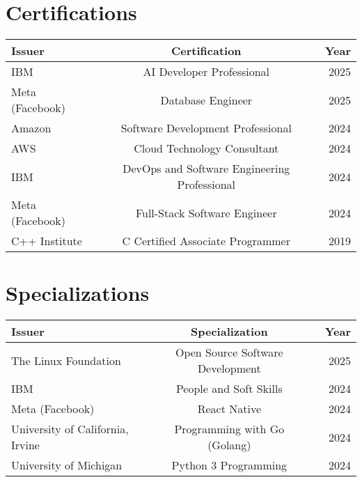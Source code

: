 \begin{samepage}
	\section{Certifications}

	\begin{tabularx}{\textwidth}{l X  c  X r}
		Issuer & & Certification & & Year \\
		\hline
		\hline
		IBM  & & AI Developer Professional & & 2025 \\
		Meta (Facebook) & & Database Engineer & & 2025 \\
		Amazon & & Software Development Professional & & 2024 \\
		AWS  & & Cloud Technology Consultant & & 2024 \\
		IBM  & & DevOps and Software Engineering Professional & & 2024 \\
		Meta (Facebook) & & Full-Stack Software Engineer & & 2024 \\
		C++ Institute & & C Certified Associate Programmer & & 2019 \\
	\end{tabularx}

	\section{Specializations}

	\begin{tabularx}{\textwidth}{l X  c  X r}
		Issuer & & Specialization & & Year \\
		\hline
		\hline
		The Linux Foundation & & Open Source Software Development & & 2025 \\
		IBM & & People and Soft Skills & & 2024 \\
		Meta (Facebook) & & React Native & & 2024 \\
		University of California, Irvine & & Programming with Go (Golang) & & 2024 \\
		University of Michigan & & Python 3 Programming & & 2024 \\
	\end{tabularx}
\end{samepage}
